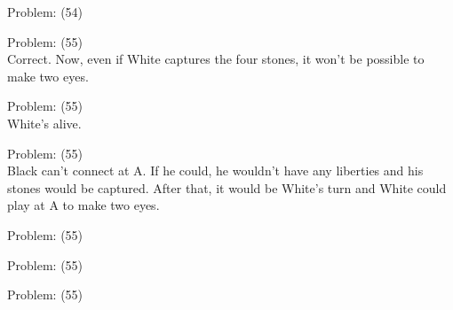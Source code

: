 \documentclass[11pt]{article}
\begin{document}
\begin{minipage}[t]{0.5\textwidth}
  {\centering
  
  Problem: (54)\\
  
  }
\end{minipage}
\begin{minipage}[t]{0.5\textwidth}
  {\centering
  
  Problem: (55)\\
  Correct. Now, even if White captures the four stones, it won't be possible to make two eyes.\\
  }
\end{minipage}
\begin{minipage}[t]{0.5\textwidth}
  {\centering
  
  Problem: (55)\\
  White's alive.\\
  }
\end{minipage}
\begin{minipage}[t]{0.5\textwidth}
  {\centering
  
  Problem: (55)\\
  Black can't connect at A. If he could, he wouldn't have any liberties and his stones would be captured. After that, it would be White’s turn and White could play at A to make two eyes.\\
  }
\end{minipage}
\begin{minipage}[t]{0.5\textwidth}
  {\centering
  
  Problem: (55)\\
  
  }
\end{minipage}
\begin{minipage}[t]{0.5\textwidth}
  {\centering
  
  Problem: (55)\\
  
  }
\end{minipage}
\begin{minipage}[t]{0.5\textwidth}
  {\centering
  
  Problem: (55)\\
  
  }
\end{minipage}
\end{document}
